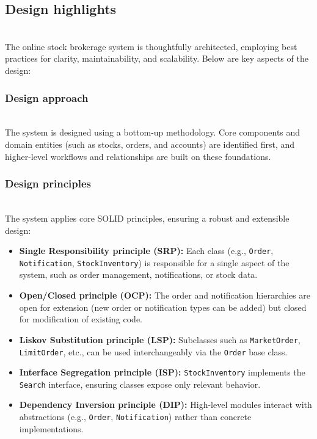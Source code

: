 \subsection{Design highlights}\label{vzS1H8GD_b9PrECX8OaTR}
\\
The online stock brokerage system is thoughtfully architected, employing best practices for clarity, maintainability, and scalability. Below are key aspects of the design:

\subsubsection{Design approach}\label{Ly5RtGBa9D5UknPbmvZY1}
\\
The system is designed using a bottom-up methodology. Core components and domain entities (such as stocks, orders, and accounts) are identified first, and higher-level workflows and relationships are built on these foundations.

\subsubsection{Design principles}\label{FfQNanqMJ4Hf8KZZSQVNG}
\\
The system applies core SOLID principles, ensuring a robust and extensible design:

\begin{itemize}
\item
\protect{}\label{gfaqzLmdvUwQVnvLkTYSG}
\textbf{Single Responsibility principle (SRP):} Each class (e.g., \texttt{Order}, \texttt{Notification}, \texttt{StockInventory}) is responsible for a single aspect of the system, such as order management, notifications, or stock data.
\item
\protect{}\label{3j89iXc8bfq91YcsQEGoj}
\textbf{Open/Closed principle (OCP):} The order and notification hierarchies are open for extension (new order or notification types can be added) but closed for modification of existing code.
\item
\protect{}\label{uTr_d4-sTzzR5PHxW_-We}
\textbf{Liskov Substitution principle (LSP):} Subclasses such as \texttt{MarketOrder}, \texttt{LimitOrder}, etc., can be used interchangeably via the \texttt{Order} base class.
\item
\protect{}\label{5prI5sxAeh5YTROIJpZTV}
\textbf{Interface Segregation principle (ISP):} \texttt{StockInventory} implements the \texttt{Search} interface, ensuring classes expose only relevant behavior.
\item
\protect{}\label{PexPSazz-0LBdN3LD1jux}
\textbf{Dependency Inversion principle (DIP):} High-level modules interact with abstractions (e.g., \texttt{Order}, \texttt{Notification}) rather than concrete implementations.
\end{itemize}

